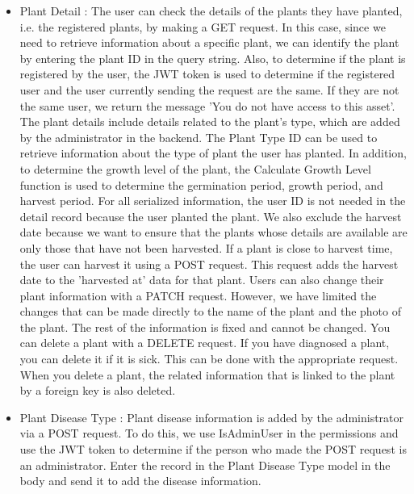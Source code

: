\documentclass[conference, a4paper]{IEEEtran}
\begin{document}
\begin{enumerate}
\begin{itemize}
\begin{itemize}
\begin{itemize}
            \item Plant Detail : The user can check the details of the plants they have planted, i.e. the registered plants, by making a GET request. In this case, since we need to retrieve information about a specific plant, we can identify the plant by entering the plant ID in the query string. Also, to determine if the plant is registered by the user, the JWT token is used to determine if the registered user and the user currently sending the request are the same. If they are not the same user, we return the message 'You do not have access to this asset'. The plant details include details related to the plant's type, which are added by the administrator in the backend. The Plant Type ID can be used to retrieve information about the type of plant the user has planted. In addition, to determine the growth level of the plant, the Calculate Growth Level function is used to determine the germination period, growth period, and harvest period. For all serialized information, the user ID is not needed in the detail record because the user planted the plant. We also exclude the harvest date because we want to ensure that the plants whose details are available are only those that have not been harvested. If a plant is close to harvest time, the user can harvest it using a POST request. This request adds the harvest date to the 'harvested at' data for that plant. Users can also change their plant information with a PATCH request. However, we have limited the changes that can be made directly to the name of the plant and the photo of the plant. The rest of the information is fixed and cannot be changed. You can delete a plant with a DELETE request. If you have diagnosed a plant, you can delete it if it is sick. This can be done with the appropriate request. When you delete a plant, the related information that is linked to the plant by a foreign key is also deleted. \\
            \item Plant Disease Type : Plant disease information is added by the administrator via a POST request. To do this, we use IsAdminUser in the permissions and use the JWT token to determine if the person who made the POST request is an administrator. Enter the record in the Plant Disease Type model in the body and send it to add the disease information. \\

\end{itemize}
\end{itemize}
\end{itemize}
\end{enumerate}
\end{document}
